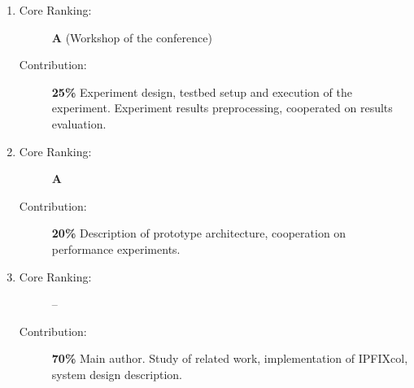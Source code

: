 \begin{enumerate}
  \item {}
  \begin{description}
    \item[Core Ranking:] \textbf{A} (Workshop of the conference)
    \item[Contribution:] \textbf{25\%} Experiment design, testbed setup and execution of the experiment. Experiment results preprocessing, cooperated on results evaluation.
  \end{description}
  
  \item {}
  \begin{description}
    \item[Core Ranking:] \textbf{A}
    \item[Contribution:] \textbf{20\%} Description of prototype architecture, cooperation on performance experiments.
  \end{description}
  
  \item {}
  \begin{description}
    \item[Core Ranking:] --
    \item[Contribution:] \textbf{70\%} Main author. Study of related work, implementation of IPFIXcol, system design description.
  \end{description}

\end{enumerate}


